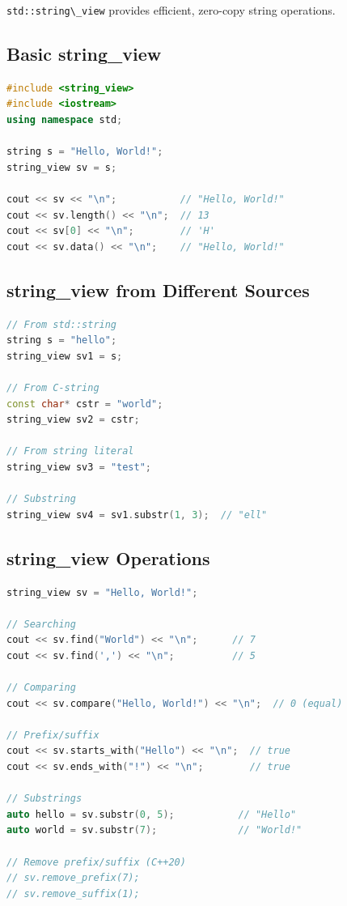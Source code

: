 \passthrough{\lstinline!std::string\_view!} provides efficient,
zero-copy string operations.

\hypertarget{basic-string_view}{%
\subsection{Basic string\_view}\label{basic-string_view}}

\begin{lstlisting}[language={C++}]
#include <string_view>
#include <iostream>
using namespace std;

string s = "Hello, World!";
string_view sv = s;

cout << sv << "\n";           // "Hello, World!"
cout << sv.length() << "\n";  // 13
cout << sv[0] << "\n";        // 'H'
cout << sv.data() << "\n";    // "Hello, World!"
\end{lstlisting}

\hypertarget{string_view-from-different-sources}{%
\subsection{string\_view from Different
Sources}\label{string_view-from-different-sources}}

\begin{lstlisting}[language={C++}]
// From std::string
string s = "hello";
string_view sv1 = s;

// From C-string
const char* cstr = "world";
string_view sv2 = cstr;

// From string literal
string_view sv3 = "test";

// Substring
string_view sv4 = sv1.substr(1, 3);  // "ell"
\end{lstlisting}

\hypertarget{string_view-operations}{%
\subsection{string\_view Operations}\label{string_view-operations}}

\begin{lstlisting}[language={C++}]
string_view sv = "Hello, World!";

// Searching
cout << sv.find("World") << "\n";      // 7
cout << sv.find(',') << "\n";          // 5

// Comparing
cout << sv.compare("Hello, World!") << "\n";  // 0 (equal)

// Prefix/suffix
cout << sv.starts_with("Hello") << "\n";  // true
cout << sv.ends_with("!") << "\n";        // true

// Substrings
auto hello = sv.substr(0, 5);           // "Hello"
auto world = sv.substr(7);              // "World!"

// Remove prefix/suffix (C++20)
// sv.remove_prefix(7);
// sv.remove_suffix(1);
\end{lstlisting}

